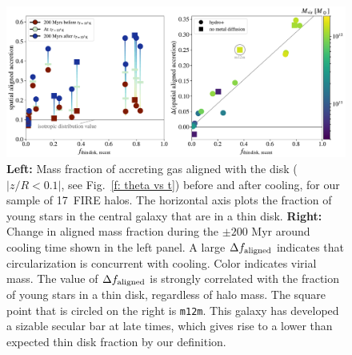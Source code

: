 \documentclass[fleqn,usenatbib]{mnras}
\newcommand{\Nsample}{17}
\begin{document}
\begin{figure}
    \centering
    \includegraphics[width=\textwidth]{figures/prevalence/aligned_fraction.pdf}
    \caption{
    \textbf{Left:}
    Mass fraction of accreting gas aligned with the disk ($\vert z/R < 0.1 \vert$, see Fig.~\ref{f: theta vs t}) before and after cooling, for our sample of \Nsample~FIRE halos.
    The horizontal axis plots the fraction of young stars in the central galaxy that are in a thin disk.
    \textbf{Right:}
    Change in aligned mass fraction during the $\pm200$ Myr around cooling time shown in the left panel.
    A large $\Delta f_{\rm aligned}$ indicates that circularization is concurrent with cooling.
    Color indicates virial mass.
    The value of $\Delta f_{\rm aligned}$ is strongly correlated with the fraction of young stars in a thin disk, regardless of halo mass.
    The square point that is circled on the right is \texttt{m12m}.
    This galaxy has developed a sizable secular bar at late times, which gives rise to a lower than expected thin disk fraction by our definition.
    }
    \label{f: prevalence}
\end{figure}
\end{document}
